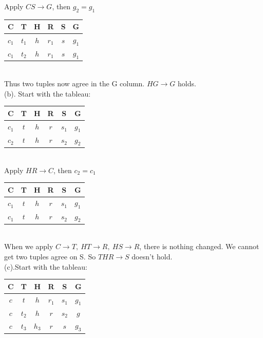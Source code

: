 \documentclass[12pt]{article}
\begin{document}
Apply $CS\rightarrow G$, then $g_{2}=g_{1}$\\

\begin{tabular}{|c|c|c|c|c|c|}
\hline
C & T & H & R & S & G \\
\hline
$c_{1}$ & $t_{1}$ & $h$ & $r_{1}$ & $s$ & $g_{1}$ \\
\hline
$c_{1}$ & $t_{2}$ & $h$ & $r_{1}$ & $s$ & $g_{1}$\\
\hline
\end{tabular}\\

Thus two tuples now agree in the G column. $HG\rightarrow G$ holds.\\

(b). Start with the tableau:\\

\begin{tabular}{|c|c|c|c|c|c|}
\hline
C & T & H & R & S & G \\
\hline
$c_{1}$ & $t$ & $h$ & $r$ & $s_{1}$ & $g_{1}$ \\
\hline
$c_{2}$ & $t$ & $h$ & $r$ & $s_{2}$ & $g_{2}$\\
\hline
\end{tabular}\\

Apply $HR\rightarrow C$, then $c_{2}=c_{1}$\\

\begin{tabular}{|c|c|c|c|c|c|}
\hline
C & T & H & R & S & G \\
\hline
$c_{1}$ & $t$ & $h$ & $r$ & $s_{1}$ & $g_{1}$ \\
\hline
$c_{1}$ & $t$ & $h$ & $r$ & $s_{2}$ & $g_{2}$\\
\hline
\end{tabular}\\

When we apply $C\rightarrow T,\ HT\rightarrow R,\ HS\rightarrow R$, there is nothing changed. We cannot get two tuples agree on S. So $THR\rightarrow S$ doesn't hold.\\

(c).Start with the tableau:\\

\begin{tabular}{|c|c|c|c|c|c|}
\hline
C & T & H & R & S & G \\
\hline
$c$ & $t$ & $h$ & $r_{1}$ & $s_{1}$ & $g_{1}$ \\
\hline
$c$ & $t_{2}$ & $h$ & $r$ & $s_{2}$ & $g$\\
\hline
$c$ & $t_{3}$ & $h_{3}$ & $r$ & $s$ & $g_{3}$\\
\hline
\end{tabular}\\
\end{document}
